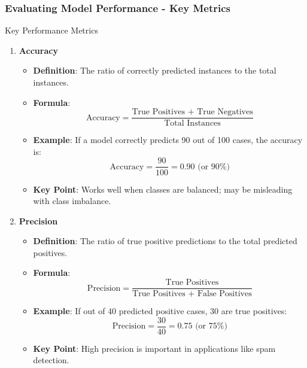 \documentclass[aspectratio=169]{beamer}
\begin{document}
\begin{frame}[fragile]
    \frametitle{Evaluating Model Performance - Key Metrics}
    \begin{block}{Key Performance Metrics}
        \begin{enumerate}
            \item \textbf{Accuracy}
                \begin{itemize}
                    \item \textbf{Definition}: The ratio of correctly predicted instances to the total instances.
                    \item \textbf{Formula}:
                    \begin{equation}
                        \text{Accuracy} = \frac{\text{True Positives + True Negatives}}{\text{Total Instances}}
                    \end{equation}
                    \item \textbf{Example}: If a model correctly predicts 90 out of 100 cases, the accuracy is:
                    \begin{equation}
                        \text{Accuracy} = \frac{90}{100} = 0.90 \text{ (or 90\%)}
                    \end{equation}
                    \item \textbf{Key Point}: Works well when classes are balanced; may be misleading with class imbalance.
                \end{itemize}

            \item \textbf{Precision}
                \begin{itemize}
                    \item \textbf{Definition}: The ratio of true positive predictions to the total predicted positives.
                    \item \textbf{Formula}:
                    \begin{equation}
                        \text{Precision} = \frac{\text{True Positives}}{\text{True Positives + False Positives}}
                    \end{equation}
                    \item \textbf{Example}: If out of 40 predicted positive cases, 30 are true positives:
                    \begin{equation}
                        \text{Precision} = \frac{30}{40} = 0.75 \text{ (or 75\%)}
                    \end{equation}
                    \item \textbf{Key Point}: High precision is important in applications like spam detection.
                \end{itemize}
        \end{enumerate}
    \end{block}
\end{frame}
\end{document}
